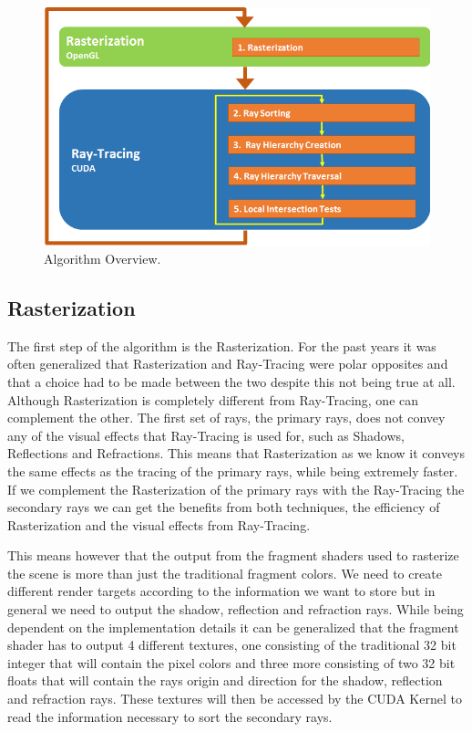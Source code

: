 \documentclass{llncs}
\begin{document}
\begin{figure}
\centering
\includegraphics[scale=0.50]{images/figure 1.png}
\caption{Algorithm Overview.}
\end{figure}

%
\subsection{Rasterization}
%

The first step of the algorithm is the Rasterization. For the past years it was often generalized that Rasterization and Ray-Tracing were polar opposites and that a choice had to be 	made between the two despite this not being true at all. Although Rasterization is completely different from Ray-Tracing, one can complement the other. The first set of rays, the primary rays, does not convey any of the visual effects that Ray-Tracing is used for, such as Shadows, Reflections and Refractions. This means that Rasterization as we know it conveys the same effects as the tracing of the primary rays, while being extremely faster. If we complement the Rasterization of the primary rays with the Ray-Tracing the secondary rays we can get the benefits from both techniques, the efficiency of Rasterization and the visual effects from Ray-Tracing.

\medskip

This means however that the output from the fragment shaders used to rasterize the scene is more than just the traditional fragment colors. We need to create different render targets according to the information we want to store but in general we need to output the shadow, reflection and refraction rays. While being dependent on the implementation details it can be generalized that the fragment shader has to output 4 different textures, one consisting of the traditional 32 bit integer that will contain the pixel colors and three more consisting of two 32 bit floats that will contain the rays origin and direction for the shadow, reflection and refraction rays. These textures will then be accessed by the CUDA Kernel to read the information necessary to sort the secondary rays.
\end{document}
